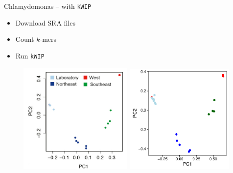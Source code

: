 \documentclass[t]{beamer}
\begin{document}
\begin{frame}{Chlamydomonas -- with \texttt{kWIP}}
  \begin{itemize}
    \item Download SRA files
    \item Count $k$-mers
    \item Run \texttt{kWIP}
  \end{itemize}
  \begin{figure}
    \centering
    \includegraphics[width=0.5\textwidth]{img/flowers.png}
    \includegraphics[width=0.48\textwidth]{img/chlamy.pdf}
  \end{figure}
\end{frame}
\end{document}
